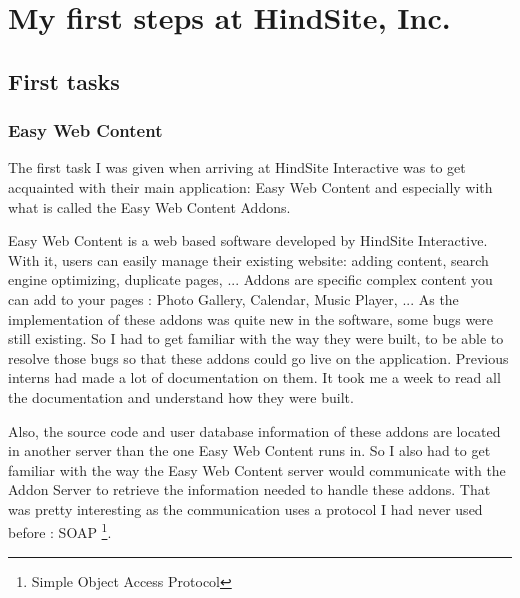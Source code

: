 \chapter{My first steps at HindSite, Inc. }

\section{First tasks}

\subsection{Easy Web Content}

The first task I was given when arriving at HindSite Interactive was to get acquainted with their main application: Easy Web Content and especially with what is called the Easy Web Content Addons.

Easy Web Content is a web based software developed by HindSite Interactive. With it, users can easily manage their existing website: adding content, search engine optimizing, duplicate pages, ... Addons are specific complex content you can add to your pages : Photo Gallery, Calendar, Music Player, ... As the implementation of these addons was quite new in the software, some bugs were still existing. So I had to get familiar with the way they were built, to be able to resolve those bugs so that these addons could go live on the application. Previous interns had made a lot of documentation on them. It took me a week to read all the documentation and understand how they were built.

Also, the source code and user database information of these addons are located in another server than the one Easy Web Content runs in. So I also had to get familiar with the way the Easy Web Content server would communicate with the Addon Server to retrieve the information needed to handle these addons. That was pretty interesting as the communication uses a protocol I had never used before : SOAP \footnote{Simple Object Access Protocol}.



